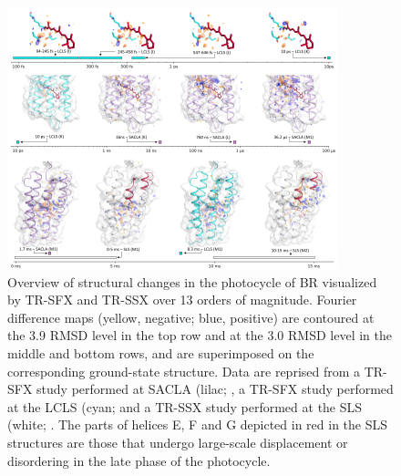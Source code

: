 \begin{figure}[H] %
    \centering
    \noindent \includegraphics[width=\textwidth]{images/Introduction/Figure5_Bacteriorhodopsin.pdf}
    \hfill
    \caption{Overview of structural changes in the photocycle of BR visualized by TR-SFX and TR-SSX over 13 orders of magnitude. Fourier difference maps (yellow, negative; blue, positive) are contoured at the 3.9 RMSD level in the top row and at the 3.0 RMSD level in the middle and bottom rows, and are superimposed on the corresponding ground-state structure. Data are reprised from a TR-SFX study performed at SACLA (lilac; \cite{nangoThreedimensionalMovieStructural2016}, a TR-SFX study performed at the LCLS (cyan; \cite{noglyRetinalIsomerizationBacteriorhodopsin2018} and a TR-SSX study performed at the SLS (white; \cite{weinertProtonUptakeMechanism2019}. The parts of helices E, F and G depicted in red in the SLS structures are those that undergo large-scale displacement or disordering in the late phase of the photocycle.}
    \label{fig:Figure5}
\end{figure}

